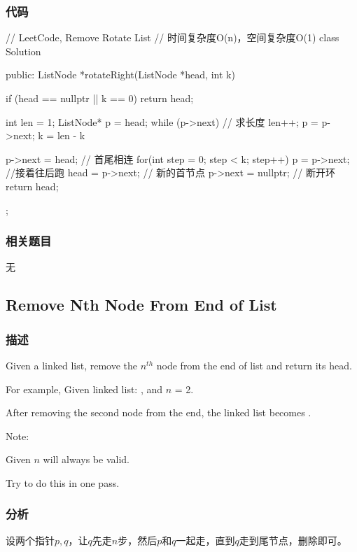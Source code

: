 \subsubsection{代码}
\begin{Code}
// LeetCode, Remove Rotate List
// 时间复杂度O(n)，空间复杂度O(1)
class Solution {
public:
    ListNode *rotateRight(ListNode *head, int k) {
        if (head == nullptr || k == 0) return head;

        int len = 1;
        ListNode* p = head;
        while (p->next) { // 求长度
            len++;
            p = p->next;
        }
        k = len - k %

        p->next = head; // 首尾相连
        for(int step = 0; step < k; step++) {
            p = p->next;  //接着往后跑
        }
        head = p->next; // 新的首节点
        p->next = nullptr; // 断开环
        return head;
    }
};
\end{Code}


\subsubsection{相关题目}

\begindot
\item 无
\myenddot


\subsection{Remove Nth Node From End of List}
\label{sec:remove-nth-node-from-end-of-list}


\subsubsection{描述}
Given a linked list, remove the $n^{th}$ node from the end of list and return its head.

For example, Given linked list: , and $n$ = 2.

After removing the second node from the end, the linked list becomes .

Note:
\begindot
\item Given $n$ will always be valid.
\item Try to do this in one pass.
\myenddot


\subsubsection{分析}
设两个指针$p,q$，让$q$先走$n$步，然后$p$和$q$一起走，直到$q$走到尾节点，删除即可。


